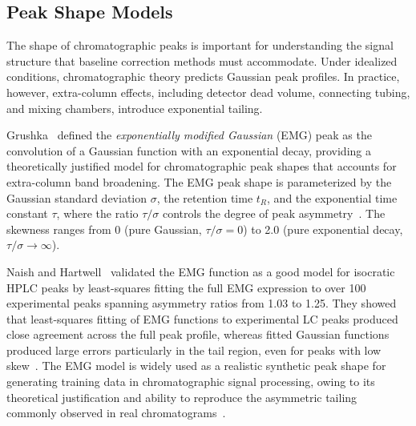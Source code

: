 \subsection{Peak Shape Models}

The shape of chromatographic peaks is important for understanding the signal structure that baseline correction methods must accommodate. Under idealized conditions, chromatographic theory predicts Gaussian peak profiles. In practice, however, extra-column effects, including detector dead volume, connecting tubing, and mixing chambers, introduce exponential tailing.

Grushka~\cite{grushka1972emg} defined the \emph{exponentially modified Gaussian} (EMG) peak as the convolution of a Gaussian function with an exponential decay, providing a theoretically justified model for chromatographic peak shapes that accounts for extra-column band broadening. The EMG peak shape is parameterized by the Gaussian standard deviation $\sigma$, the retention time $t_R$, and the exponential time constant $\tau$, where the ratio $\tau/\sigma$ controls the degree of peak asymmetry~\cite{grushka1972emg}. The skewness ranges from 0 (pure Gaussian, $\tau/\sigma = 0$) to 2.0 (pure exponential decay, $\tau/\sigma \to \infty$).

Naish and Hartwell~\cite{naish1988emg} validated the EMG function as a good model for isocratic HPLC peaks by least-squares fitting the full EMG expression to over 100 experimental peaks spanning asymmetry ratios from 1.03 to 1.25. They showed that least-squares fitting of EMG functions to experimental LC peaks produced close agreement across the full peak profile, whereas fitted Gaussian functions produced large errors particularly in the tail region, even for peaks with low skew~\cite{naish1988emg}. The EMG model is widely used as a realistic synthetic peak shape for generating training data in chromatographic signal processing, owing to its theoretical justification and ability to reproduce the asymmetric tailing commonly observed in real chromatograms~\cite{grushka1972emg}.



